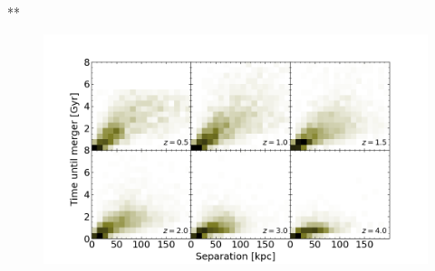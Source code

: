\documentclass[twocolumn]{aastex631}
\begin{document}

** 
\appendix
\begin{figure}[htb]
    \centering
    \includegraphics[width=\textwidth]{plots/bet-on-it/3_Timevsseplow-2d.png}
    \caption{}
\end{figure}
\end{document}
